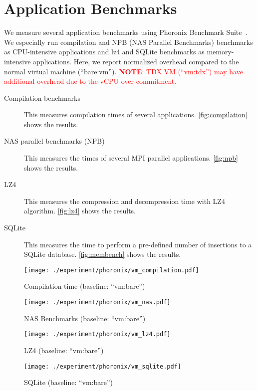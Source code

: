\documentclass[letterpaper,twocolumn,10pt]{article}
\newcommand{\MP}[1]{\textcolor{red}{#1}}
\newcommand{\grumbler}[2]{\MP{{\bf #1}: #2}}
\newcommand{\note}[1]{\grumbler{NOTE}{#1}}
\begin{document}
\section{Application Benchmarks}
\label{sec:app:benchmark}

We measure several application benchmarks using Phoronix Benchmark Suite~\cite{phoronix}.
We especially run compilation and NPB (NAS Parallel Benchmarks) benchmarks as CPU-intensive applications and lz4 and SQLite benchmarks as memory-intensive applications.
Here, we report normalized overhead compared to the normal virtual machine (``bare:vm'').
\note{TDX VM (``vm:tdx'') may have additional overhead due to the vCPU over-commitment.}

\begin{description}
\item[Compilation benchmarks~\cite{compilation}] This measures compilation times of several applications. \autoref{fig:compilation} shows the results.
\item[NAS parallel benchmarks (NPB)~\cite{npb}] This measures the times of several MPI parallel applications. \autoref{fig:npb} shows the results.
\item[LZ4~\cite{lz4}] This measures the compression and decompression time with LZ4 algorithm. \autoref{fig:lz4} shows the results.
\item[SQLite~\cite{sqlite_bench}] This measures the time to perform a pre-defined number of insertions to a SQLite database. \autoref{fig:membench} shows the results.
\end{description}

\begin{figure*}[t]
\centering
\texttt{[image: ./experiment/phoronix/vm\_compilation.pdf]}
\caption{Compilation time (baseline: ``vm:bare'')}
\label{fig:compilation}
\end{figure*}

\begin{figure*}[t]
\centering
\texttt{[image: ./experiment/phoronix/vm\_nas.pdf]}
\caption{NAS Benchmarks (baseline: ``vm:bare'')}
\label{fig:npb}
\end{figure*}

\begin{figure*}[t]
\centering
\texttt{[image: ./experiment/phoronix/vm\_lz4.pdf]}
\caption{LZ4  (baseline: ``vm:bare'')}
\label{fig:lz4}
\end{figure*}

\begin{figure*}[t]
\centering
\texttt{[image: ./experiment/phoronix/vm\_sqlite.pdf]}
\caption{SQLite  (baseline: ``vm:bare'')}
\label{fig:sqlite}
\end{figure*}
\end{document}
